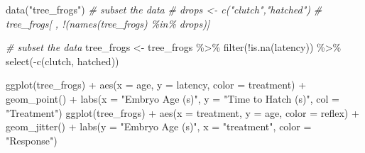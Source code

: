 \documentclass[
]{book}
\newenvironment{Shaded}{\begin{snugshade}}{\end{snugshade}}
\newcommand{\AttributeTok}[1]{\textcolor[rgb]{0.77,0.63,0.00}{#1}}
\newcommand{\CommentTok}[1]{\textcolor[rgb]{0.56,0.35,0.01}{\textit{#1}}}
\newcommand{\FunctionTok}[1]{\textcolor[rgb]{0.00,0.00,0.00}{#1}}
\newcommand{\NormalTok}[1]{#1}
\newcommand{\OtherTok}[1]{\textcolor[rgb]{0.56,0.35,0.01}{#1}}
\newcommand{\SpecialCharTok}[1]{\textcolor[rgb]{0.00,0.00,0.00}{#1}}
\newcommand{\StringTok}[1]{\textcolor[rgb]{0.31,0.60,0.02}{#1}}
\begin{document}
\begin{Shaded}
\begin{Highlighting}[]
\FunctionTok{data}\NormalTok{(}\StringTok{"tree\_frogs"}\NormalTok{)}
\CommentTok{\# subset the data}
\CommentTok{\# drops \textless{}{-} c("clutch","hatched")}
\CommentTok{\# tree\_frogs[ , !(names(tree\_frogs) \%in\% drops)]}



\CommentTok{\# subset the data}
\NormalTok{tree\_frogs }\OtherTok{\textless{}{-}}\NormalTok{ tree\_frogs }\SpecialCharTok{\%\textgreater{}\%}
  \FunctionTok{filter}\NormalTok{(}\SpecialCharTok{!}\FunctionTok{is.na}\NormalTok{(latency)) }\SpecialCharTok{\%\textgreater{}\%}
  \FunctionTok{select}\NormalTok{(}\SpecialCharTok{{-}}\FunctionTok{c}\NormalTok{(clutch, hatched))}
    


\FunctionTok{ggplot}\NormalTok{(tree\_frogs) }\SpecialCharTok{+}
    \FunctionTok{aes}\NormalTok{(}\AttributeTok{x =}\NormalTok{ age, }\AttributeTok{y =}\NormalTok{ latency, }\AttributeTok{color =}\NormalTok{ treatment) }\SpecialCharTok{+}
    \FunctionTok{geom\_point}\NormalTok{() }\SpecialCharTok{+}
    \FunctionTok{labs}\NormalTok{(}\AttributeTok{x =} \StringTok{"Embryo Age (s)"}\NormalTok{, }\AttributeTok{y =} \StringTok{"Time to Hatch (s)"}\NormalTok{, }\AttributeTok{col =} \StringTok{"Treatment"}\NormalTok{)}
\FunctionTok{ggplot}\NormalTok{(tree\_frogs) }\SpecialCharTok{+}
    \FunctionTok{aes}\NormalTok{(}\AttributeTok{x =}\NormalTok{ treatment, }\AttributeTok{y =}\NormalTok{ age, }\AttributeTok{color =}\NormalTok{ reflex) }\SpecialCharTok{+}
    \FunctionTok{geom\_jitter}\NormalTok{() }\SpecialCharTok{+}
    \FunctionTok{labs}\NormalTok{(}\AttributeTok{y =} \StringTok{"Embryo Age (s)"}\NormalTok{,}
         \AttributeTok{x =} \StringTok{"treatment"}\NormalTok{,}
         \AttributeTok{color =} \StringTok{"Response"}\NormalTok{)}
\end{Highlighting}
\end{Shaded}
\end{document}
